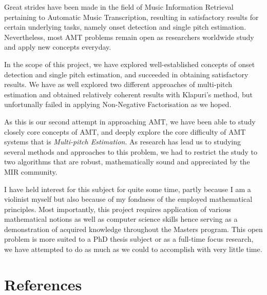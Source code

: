 \documentclass[
  american,
]{article}
\begin{document}
Great strides have been made in the field of Music Information
Retrieval pertaining to Automatic Music Transcription,
resulting in satisfactory results for certain underlying
tasks, namely onset detection and single pitch estimation.
Nevertheless, most AMT problems remain open as researchers
worldwide study and apply new concepts everyday.

In the scope of this project, we have explored well-established concepts
of onset detection and single pitch estimation, and succeeded in obtaining
satisfactory results.
We have as well explored two different approaches of multi-pitch estimation
and obtained relatively coherent results with Klapuri's method,
but unfortunally failed in applying Non-Negative Factorisation
as we hoped.

As this is our second attempt in approaching AMT,
we have been able to study closely core concepts of AMT,
and deeply explore the core difficulty of AMT systems
that is \emph{Multi-pitch Estimation}.
As research has lead us to studying several methods and approaches
to this problem, we had to restrict the study to two algorithms
that are robust, mathematically sound and appreciated by the MIR community.

I have held interest for this subject for quite some time,
partly because I am a violinist myself but also because
of my fondness of the employed mathematical principles.
Most importantly, this project requires application of various
mathematical notions as well as computer science skills
hence serving as a demonstration of acquired knowledge
throughout the Masters program.
This open problem is more suited to a PhD thesis subject or
as a full-time focus research, we have attempted to do as much
as we could to accomplish with very little time.

\pagebreak

\hypertarget{references}{%
\section*{References}\label{references}}
\end{document}

